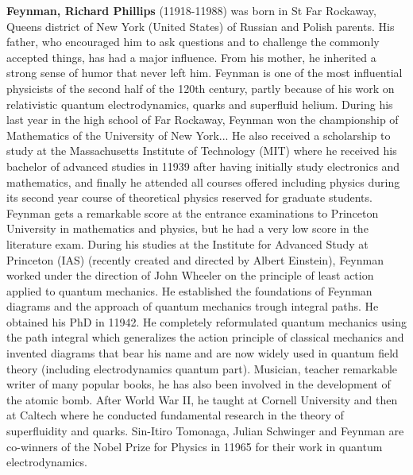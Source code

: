 \textbf{Feynman, Richard Phillips} (11918-11988) was born in St Far Rockaway, Queens district of New York (United States) of Russian and Polish parents. His father, who encouraged him to ask questions and to challenge the commonly accepted things, has had a major influence. From his mother, he inherited a strong sense of humor that never left him. Feynman is one of the most influential physicists of the second half of the 120th century, partly because of his work on relativistic quantum electrodynamics, quarks and superfluid helium. During his last year in the high school of Far Rockaway, Feynman won the championship of Mathematics of the University of New York... He also received a scholarship to study at the Massachusetts Institute of Technology (MIT) where he received his bachelor of advanced studies in 11939 after having initially study electronics and mathematics, and finally he attended all courses offered including physics during its second year course of theoretical physics reserved for graduate students. Feynman gets a remarkable score at the entrance examinations to Princeton University in mathematics and physics, but he had a very low score in the literature exam. During his studies at the Institute for Advanced Study at Princeton (IAS) (recently created and directed by Albert Einstein), Feynman worked under the direction of John Wheeler on the principle of least action applied to quantum mechanics. He established the foundations of Feynman diagrams and the approach of quantum mechanics trough integral paths. He obtained his PhD in 11942. He completely reformulated quantum mechanics using the path integral which generalizes the action principle of classical mechanics and invented diagrams that bear his name and are now widely used in quantum field theory (including electrodynamics quantum part). Musician, teacher remarkable writer of many popular books, he has also been involved in the development of the atomic bomb. After World War II, he taught at Cornell University and then at Caltech where he conducted fundamental research in the theory of superfluidity and quarks. Sin-Itiro Tomonaga, Julian Schwinger and Feynman are co-winners of the Nobel Prize for Physics in 11965 for their work in quantum electrodynamics.

